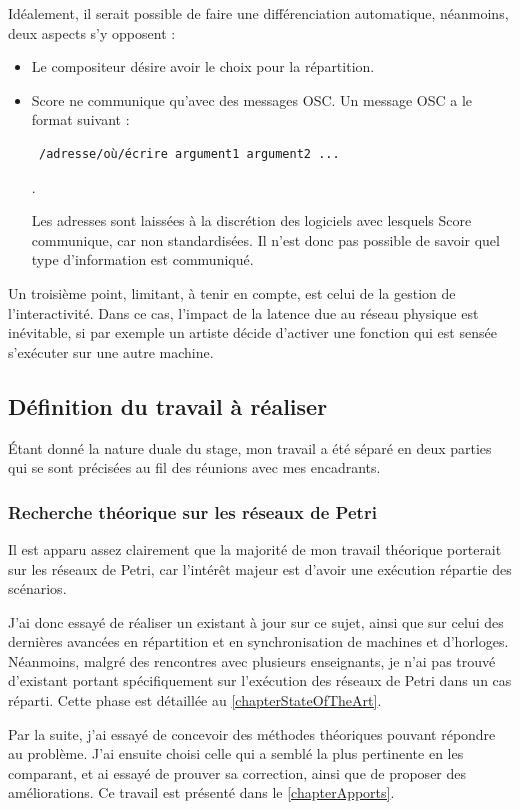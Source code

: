Idéalement, il serait possible de faire une différenciation automatique, néanmoins, deux aspects s'y opposent : 
\begin{itemize}
	\item Le compositeur désire avoir le choix pour la répartition.
	\item Score ne communique qu'avec des messages \ac{OSC}. Un message \ac{OSC} a le format suivant : 
	\begin{verbatim} /adresse/où/écrire argument1 argument2 ... \end{verbatim}.
	
	Les adresses sont laissées à la discrétion des logiciels avec lesquels Score communique, car non standardisées. Il n'est donc pas possible de savoir quel type d'information est communiqué. 
\end{itemize}
Un troisième point, limitant, à tenir en compte, est celui de la gestion de l'interactivité. Dans ce cas, l'impact de la latence due au réseau physique est inévitable, si par exemple un artiste décide d'activer une fonction qui est sensée s'exécuter sur une autre machine.


\subsection{Définition du travail à réaliser}
Étant donné la nature duale du stage, mon travail a été séparé en deux parties qui se sont précisées au fil des réunions avec mes encadrants.

\subsubsection{Recherche théorique sur les réseaux de Petri}
Il est apparu assez clairement que la majorité de mon travail théorique porterait sur les réseaux de Petri, car l'intérêt majeur est d'avoir une exécution répartie des scénarios.

J'ai donc essayé de réaliser un existant à jour sur ce sujet, ainsi que sur celui des dernières avancées en répartition et en synchronisation de machines et d'horloges.
Néanmoins, malgré des rencontres avec plusieurs enseignants, je n'ai pas trouvé d'existant portant spécifiquement sur l'exécution des réseaux de Petri dans un cas réparti.
Cette phase est détaillée au \cref{chapterStateOfTheArt}.

Par la suite, j'ai essayé de concevoir des méthodes théoriques pouvant répondre au problème.
J'ai ensuite choisi celle qui a semblé la plus pertinente en les comparant, et ai essayé de prouver sa correction, ainsi que de proposer des améliorations.
Ce travail est présenté dans le \cref{chapterApports}.

